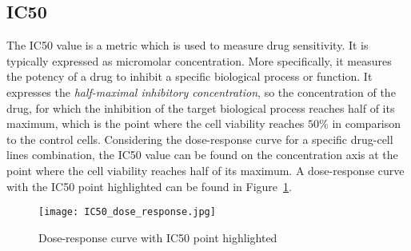 \subsection{IC50}\label{subsec:ds_ic50}
The \textsc{IC50} value is a metric which is used to measure drug sensitivity. It is typically expressed as micromolar concentration. More specifically, it measures the potency of a drug to inhibit a specific biological process or function. It expresses the \textit{half-maximal inhibitory concentration}, so the concentration of the drug, for which the inhibition of the target biological process reaches half of its maximum, which is the point where the cell viability reaches $50\%$ in comparison to the control cells.
Considering the dose-response curve for a specific drug-cell lines combination, the IC50 value can be found on the concentration axis at the point where the cell viability reaches half of its maximum. A dose-response curve with the IC50 point highlighted can be found in Figure~\ref{fig:ic50}.
\begin{figure}
	\centering
	\texttt{[image: IC50\_dose\_response.jpg]}
	\caption{Dose-response curve with IC50 point highlighted}
	\label{fig:ic50}
\end{figure}
